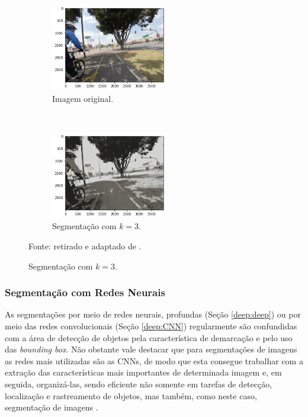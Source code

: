 \begin{figure}[H]
   \caption{Segmentação com K-means.}
   \centering
   \label{segment:fig:5}
    \begin{subfigure}[t]{0.45\textwidth}
        \centering
        \includegraphics[height=1.5in]{recursos/imagens/image_seg/i1.png}
        \caption{Imagem original.}
        \label{segment:fig:5.1}
    \end{subfigure}%
    ~ 
    \begin{subfigure}[t]{0.45\textwidth}
        \centering
        \includegraphics[height=1.5in]{recursos/imagens/image_seg/i2.png}
        \caption{Segmentação com $k = 3$.}
        \label{segment:fig:5.2}
    \end{subfigure}%

    Fonte: retirado e adaptado de \cite{Neuhold2017_ICCV}.
\end{figure}

\subsubsection{Segmentação com Redes Neurais}
\label{segment:neural}

As segmentações por meio de redes neurais, profundas (Seção \ref{deep:deep}) ou por meio das redes convolucionais (Seção \ref{deep:CNN}) regularmente são confundidas com a área de detecção de objetos \cite{Ghosh2019} pela característica de demarcação e pelo uso das \textit{bounding box}. Não obstante vale destacar que para segmentações de imagens as redes mais utilizadas são as CNNs, de modo que esta consegue trabalhar com a extração das características mais importantes de determinada imagem e, em seguida, organizá-las, sendo eficiente não somente em tarefas de detecção, localização e rastreamento de objetos, mas também, como neste caso, segmentação de imagens \cite{Ghosh2019}.

